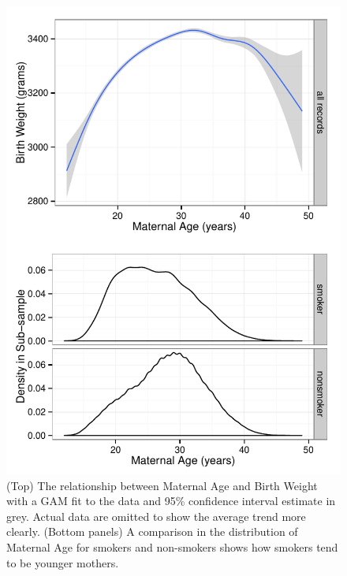 \documentclass[a4paper, 12pt]{article}
\begin{document}
\begin{itemize}
\begin{figure}[htbp]
\begin{center}
\includegraphics{img/bw-age.pdf}
\caption{(Top) The relationship between Maternal Age and Birth Weight with a GAM fit to the data and 95\% confidence interval estimate in grey.  Actual data are omitted to show the average trend more clearly.  (Bottom panels) A comparison in the distribution of Maternal Age for smokers and non-smokers shows how smokers tend to be younger mothers.}
\label{fig:bwAge}
\end{center}
\end{figure}


\end{itemize}
\end{document}
